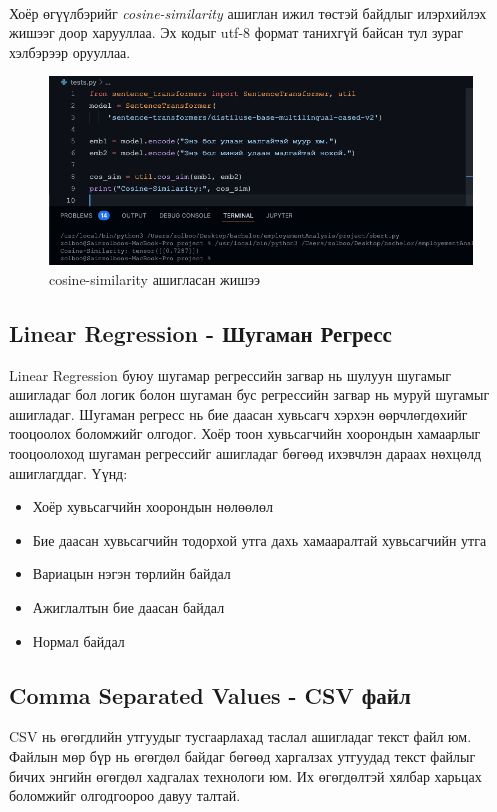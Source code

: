 \\Хоёр өгүүлбэрийг \textit{cosine-similarity} ашиглан ижил төстэй байдлыг илэрхийлэх жишээг доор харууллаа. Эх кодыг utf-8 формат танихгүй байсан тул зураг хэлбэрээр орууллаа.
\\
\begin{figure}[ht]
  \includegraphics[width=\textwidth]{images/sbert.png}
  \caption{cosine-similarity ашигласан жишээ}
  \label{fig:cosineSimilarityExample}
\end{figure}
\subsection{Linear Regression - Шугаман Регресс}
Linear Regression буюу шугамар регрессийн загвар нь шулуун шугамыг ашигладаг бол логик болон шугаман бус регрессийн загвар нь муруй шугамыг ашигладаг. Шугаман регресс нь бие даасан хувьсагч хэрхэн өөрчлөгдөхийг тооцоолох боломжийг олгодог. Хоёр тоон хувьсагчийн хоорондын хамаарлыг тооцоолоход шугаман регрессийг ашигладаг бөгөөд ихэвчлэн дараах нөхцөлд ашиглагддаг. Үүнд:
\begin{itemize}
  \item Хоёр хувьсагчийн хоорондын нөлөөлөл
  \item Бие даасан хувьсагчийн тодорхой утга дахь хамааралтай хувьсагчийн утга
  \item Вариацын нэгэн төрлийн байдал
  \item Ажиглалтын бие даасан байдал
  \item Нормал байдал
\end{itemize}
\subsection{Comma Separated Values - CSV файл}
CSV нь өгөгдлийн утгуудыг тусгаарлахад таслал ашигладаг текст файл юм. Файлын мөр бүр нь өгөгдөл байдаг бөгөөд харгалзах утгуудад текст файлыг бичих энгийн өгөгдөл хадгалах технологи юм. Их өгөгдөлтэй хялбар харьцах боломжийг олгодгоороо давуу талтай.
